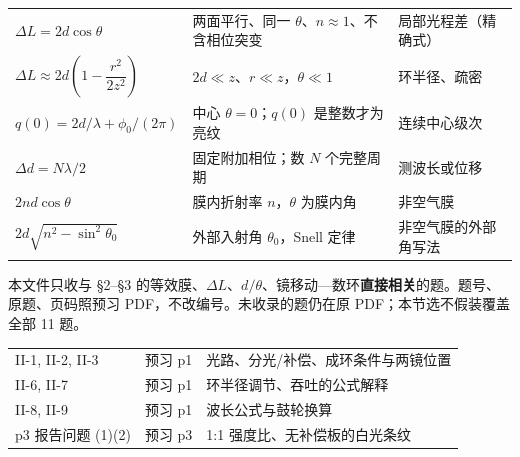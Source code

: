\documentclass[11pt]{ctexart}
\begin{document}


\begin{center}
\small
\begin{tabular}{@{}L{4.8cm}L{6.2cm}L{4.8cm}@{}}
\toprule
{} &  & \\
\midrule
\(\Delta L=2d\cos\theta\) & 两面平行、同一 \(\theta\)、\(n\approx1\)、不含相位突变 & 局部光程差（精确式）\\
\(\Delta L\approx2d\left(1-\dfrac{r^2}{2z^2}\right)\) & \(2d\ll z\)、\(r\ll z\)，\(\theta\ll1\) & 环半径、疏密\\
\(q(0)=2d/\lambda+\phi_0/(2\pi)\) & 中心 \(\theta=0\)；\(q(0)\) 是整数才为亮纹 & 连续中心级次\\
\(\Delta d=N\lambda/2\) & 固定附加相位；数 \(N\) 个完整周期 & 测波长或位移\\
\(2nd\cos\theta\) & 膜内折射率 \(n\)，\(\theta\) 为膜内角 & 非空气膜\\
\(2d\sqrt{n^2-\sin^2\theta_0}\) & 外部入射角 \(\theta_0\)，Snell 定律 & 非空气膜的外部角写法\\
\bottomrule
\end{tabular}
\end{center}



本文件只收与 §2--§3 的等效膜、\(\Delta L\)、\(d/\theta\)、镜移动—数环\textbf{直接相关}的题。题号、原题、页码照预习 PDF，不改编号。未收录的题仍在原 PDF；本节选不假装覆盖全部 11 题。

\begin{center}
\small
\begin{tabular}{@{}L{6.2cm}L{4.0cm}L{5.6cm}@{}}
\toprule
{} &  & \\
\midrule
II-1, II-2, II-3 & 预习 p1 & 光路、分光/补偿、成环条件与两镜位置\\
II-6, II-7 & 预习 p1 & 环半径调节、吞吐的公式解释\\
II-8, II-9 & 预习 p1 & 波长公式与鼓轮换算\\
p3 报告问题 (1)(2) & 预习 p3 & 1:1 强度比、无补偿板的白光条纹\\
\bottomrule
\end{tabular}
\end{center}
\end{document}
